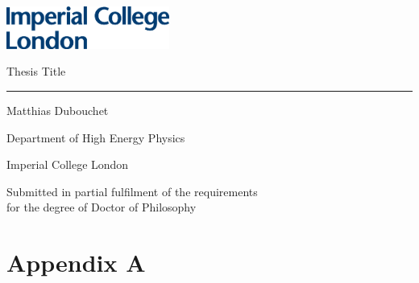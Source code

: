 \documentclass[12pt, a4paper, twoside]{report}
\begin{document}
\thispagestyle{empty}
\includegraphics[width=0.4\textwidth]{IMP_ML_1CS_4CP.eps}
\vfill
\begin{center}
    
    {\huge Thesis Title}
    
    \rule{7cm}{1pt}
    \vspace{2cm}
    
    {\Large Matthias Dubouchet}
    \vspace{1cm}
    
    {\Large Department of High Energy Physics
    
    Imperial College London}
    \vspace{3cm}
    
    {\large Submitted in partial fulfilment of the requirements\\for the degree of Doctor of Philosophy}
    
\end{center}

\vfill
\clearpage

\shipout\null






\tableofcontents
\printglossary[type=\acronymtype]
\clearpage











\appendix
\chapter{Appendix A}

\printbibliography

\listoffigures
\listoftables
\end{document}
